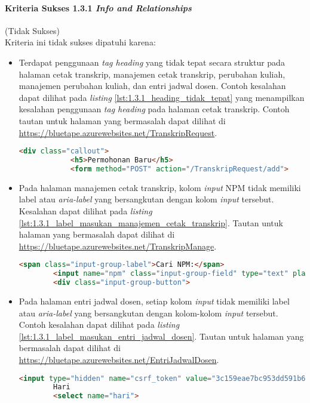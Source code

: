 \paragraph{Kriteria Sukses 1.3.1 \textit{Info and Relationships}}
\label{par:kepatuhan_bluetape_kriteria_sukses_1.3.1}
(Tidak Sukses)\\

Kriteria ini tidak sukses dipatuhi karena:
\begin{itemize}
    \item Terdapat penggunaan \textit{tag heading} yang tidak tepat secara struktur pada halaman cetak transkrip, manajemen cetak transkrip, perubahan kuliah, manajemen perubahan kuliah, dan entri jadwal dosen. Contoh kesalahan dapat dilihat pada \textit{listing} \ref{lst:1.3.1_heading_tidak_tepat} yang menampilkan kesalahan penggunaan \textit{tag heading} pada halaman cetak transkrip. Contoh tautan untuk halaman yang bermasalah dapat dilihat di \url{https://bluetape.azurewebsites.net/TranskripRequest}.
    \begin{lstlisting}[frame=single, label={lst:1.3.1_heading_tidak_tepat}, language=HTML, caption=Pelanggaran Kriteria Sukses 1.3.1 pada Halaman Cetak Transkrip]
        <div class="callout">
            <h5>Permohonan Baru</h5>
            <form method="POST" action="/TranskripRequest/add">
    \end{lstlisting}

    \item Pada halaman manajemen cetak transkrip, kolom \textit{input} NPM tidak memiliki label atau \textit{aria-label} yang bersangkutan dengan kolom \textit{input} tersebut. Kesalahan dapat dilihat pada \textit{listing} \ref{lst:1.3.1_label_masukan_manajemen_cetak_transkrip}. Tautan untuk halaman yang bermasalah dapat dilihat di \url{https://bluetape.azurewebsites.net/TranskripManage}.
    \begin{lstlisting}[frame=single, label={lst:1.3.1_label_masukan_manajemen_cetak_transkrip}, language=HTML, caption=Pelanggaran Kriteria Sukses 1.3.1 pada Halaman Manajemen Cetak Transkrip]
        <span class="input-group-label">Cari NPM:</span>
        <input name="npm" class="input-group-field" type="text" placeholder="2013730013" maxlength="10" minlength="10"/>
        <div class="input-group-button">
    \end{lstlisting}

    \item Pada halaman entri jadwal dosen, setiap kolom \textit{input} tidak memiliki label atau \textit{aria-label} yang bersangkutan dengan kolom-kolom \textit{input} tersebut. Contoh kesalahan dapat dilihat pada \textit{listing} \ref{lst:1.3.1_label_masukan_entri_jadwal_dosen}. Tautan untuk halaman yang bermasalah dapat dilihat di \url{https://bluetape.azurewebsites.net/EntriJadwalDosen}.
    \begin{lstlisting}[frame=single, label={lst:1.3.1_label_masukan_entri_jadwal_dosen}, language=HTML, caption=Pelanggaran Kriteria Sukses 1.3.1 pada Halaman Entri Jadwal Dosen]
        <input type="hidden" name="csrf_token" value="3c159eae7bc953dd591b679c080ed066"/>
        Hari
        <select name="hari">
    \end{lstlisting}
\end{itemize} 

